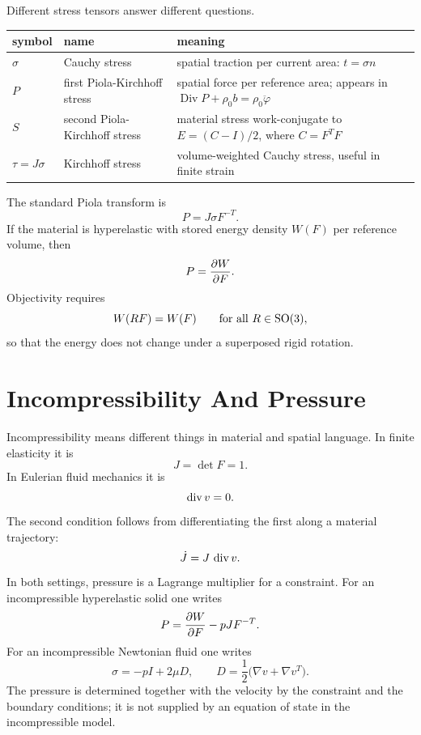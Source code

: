 Different stress tensors answer different questions.

\begin{center}
\begin{tabular}{p{} p{} p{}}
\hline
symbol & name & meaning\\
\hline
\(\sigma\) & Cauchy stress & spatial traction per current area:
\(t=\sigma n\)\\
\(P\) & first Piola-Kirchhoff stress & spatial force per reference area;
appears in \(\operatorname{Div}P+\rho_0 b=\rho_0\ddot\varphi\)\\
\(S\) & second Piola-Kirchhoff stress & material stress work-conjugate to
\(E=(C-I)/2\), where \(C=F^TF\)\\
\(\tau=J\sigma\) & Kirchhoff stress & volume-weighted Cauchy stress, useful in
finite strain\\
\hline
\end{tabular}
\end{center}

The standard Piola transform is
\[
        P=J\sigma F^{-T}.
\]
If the material is hyperelastic with stored energy density \(W(F)\) per
reference volume, then
\[
        P=\frac{\partial W}{\partial F}.
\]
Objectivity requires
\[
        W(RF)=W(F)\qquad \text{for all }R\in\operatorname{SO}(3),
\]
so that the energy does not change under a superposed rigid rotation.

\section{Incompressibility And Pressure}
\label{sec:continuum-incompressibility-pressure}

Incompressibility means different things in material and spatial language.  In
finite elasticity it is
\[
        J=\det F=1.
\]
In Eulerian fluid mechanics it is
\[
        \operatorname{div} v=0.
\]
The second condition follows from differentiating the first along a material
trajectory:
\[
        \dot J=J\,\operatorname{div} v.
\]
In both settings, pressure is a Lagrange multiplier for a constraint.  For an
incompressible hyperelastic solid one writes
\[
        P=\frac{\partial W}{\partial F}-pJF^{-T}.
\]
For an incompressible Newtonian fluid one writes
\[
        \sigma=-pI+2\mu D,\qquad
        D=\frac{1}{2}\bigl(\nabla v+\nabla v^T\bigr).
\]
The pressure is determined together with the velocity by the constraint and
the boundary conditions; it is not supplied by an equation of state in the
incompressible model.

